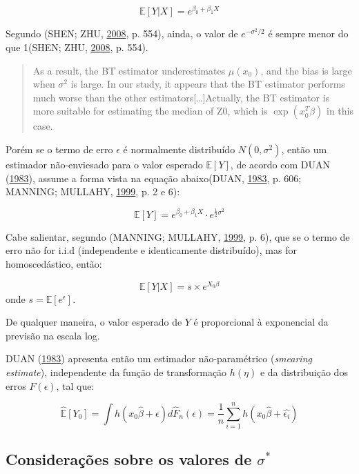 \documentclass[a4paper, 12pt]{article}
\begin{document}
\[\mathbb{E}[Y|X] = e^{\beta_0 + \beta_1X}\]

Segundo (SHEN; ZHU, \protect\hyperlink{ref-shen}{2008}, p. 554), ainda,
o valor de \(e^{-\sigma^2/2}\) é sempre menor do que 1(SHEN; ZHU,
\protect\hyperlink{ref-shen}{2008}, p. 554).

\begin{quote}
As a result, the BT estimator underestimates \(\mu(x_0)\), and the bias
is large when \(\sigma^2\) is large. In our study, it appears that the
BT estimator performs much worse than the other
estimators{[}\ldots{}{]}Actually, the BT estimator is more suitable for
estimating the median of Z0, which is \(\exp(x_0^T\beta)\) in this case.
\end{quote}

Porém se o termo de erro \(\epsilon\) é normalmente distribuído
\(N(0,\sigma^2)\), então um estimador não-enviesado para o valor
esperado \(\mathbb{E}[Y]\), de acordo com DUAN
(\protect\hyperlink{ref-Duan}{1983}), assume a forma vista na equação
abaixo(DUAN, \protect\hyperlink{ref-Duan}{1983}, p. 606; MANNING;
MULLAHY, \protect\hyperlink{ref-NBERt0246}{1999}, p. 2 e 6):

\[\mathbb{E}[Y] = e^{\beta_0 + \beta_1X} \cdot e^{\frac{1}{2}\sigma^2}\]

Cabe salientar, segundo (MANNING; MULLAHY,
\protect\hyperlink{ref-NBERt0246}{1999}, p. 6), que se o termo de erro
não for i.i.d (independente e identicamente distribuído), mas for
homoscedástico, então:

\[\mathbb{E}[Y|X]=s \times e^{X_0\beta}\] onde
\(s = \mathbb{E}[e^\epsilon]\).

De qualquer maneira, o valor esperado de \(Y\) é proporcional à
exponencial da previsão na escala log.

DUAN (\protect\hyperlink{ref-Duan}{1983}) apresenta então um estimador
não-paramétrico (\emph{smearing estimate}), independente da função de
transformação \(h(\eta)\) e da distribuição dos erros \(F(\epsilon)\),
tal que:

\[\hat{\mathbb{E}}[Y_0] = \int h(x_0\hat{\beta} + \epsilon)d\hat{F}_n(\epsilon) = \frac{1}{n}\sum_{i = 1}^{n}h(x_0\hat{\beta}+\hat{\epsilon_i})\]

\subsection{\texorpdfstring{Considerações sobre os valores de
\(\sigma^*\)}{Considerações sobre os valores de \textbackslash{}sigma\^{}*}}\label{consideracoes-sobre-os-valores-de-sigma}
\end{document}
